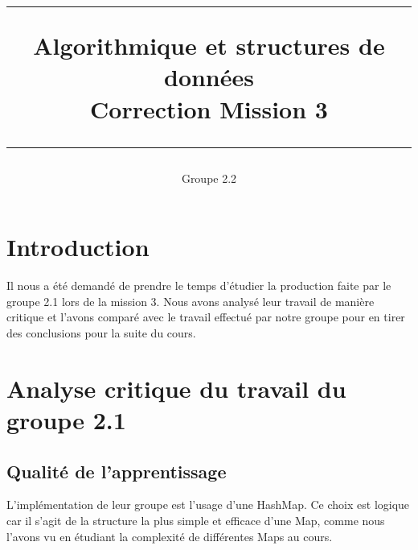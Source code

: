 \documentclass[a4paper,10pt]{article}
\begin{document}


\setcounter{section}{0}
\setcounter{subsection}{0}



\begin{titlepage}


\title{ \parbox{10 cm }{\vspace{5cm}
\begin{center}\sf\huge
\rule{10 cm}{1 pt}
\medskip
Algorithmique et structures de données\\Correction Mission 3\\[-4 mm]
\rule{10 cm }{1 pt}
\end{center}
}}
\author {Groupe 2.2}
\end{titlepage}



\maketitle
\thispagestyle{empty} 

\newpage

\section{Introduction}

	Il nous a été demandé de prendre le temps d'étudier la production faite par le groupe 2.1 lors de la mission 3. Nous avons analysé leur travail de manière critique et l'avons comparé avec le travail effectué par notre groupe pour en tirer des conclusions pour la suite du cours.

\section{Analyse critique du travail du groupe 2.1 }

\subsection{Qualité de l'apprentissage}

	L'implémentation de leur groupe est l'usage d'une HashMap. Ce choix est logique car il s'agit de la structure la plus simple et efficace d'une Map, comme nous l'avons vu en étudiant la complexité de différentes Maps au cours.
	
\end{document}
